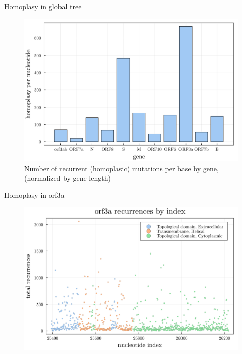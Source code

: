 \documentclass{beamer}
\begin{document}
\begin{frame}{Homoplasy in global tree}
    \begin{figure}
        \includegraphics[width=\textwidth]{gene_freq.png}
        \caption{Number of recurrent (homoplasic) mutations per base by gene, (normalized by gene length)}
    \end{figure}
\end{frame}
\begin{frame}{Homoplasy in orf3a}
    \begin{figure}
        \includegraphics[width=\textwidth]{orf3a_scatter_2.png}
    \end{figure}
\end{frame}


\begin{frame}[allowframebreaks]



\end{frame}
\end{document}
